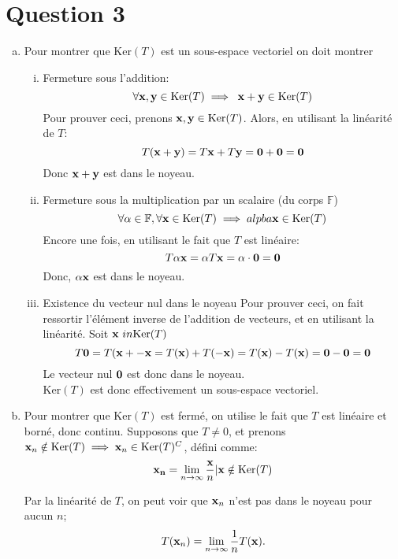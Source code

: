 \documentclass[letterpaper,12pt,oneside,final]{book}
\begin{document}
\newpage
\section*{Question 3}

\begin{enumerate}[a)]

\item %
Pour montrer que \( \text{Ker}(T) \) est un sous-espace vectoriel on doit montrer 
\begin{enumerate}[i)]
    \item Fermeture sous l'addition:
\[ \forall \vb{x},\vb{y} \in \text{Ker}(T) \implies \; \vb{x}+\vb{y} \in \text{Ker}(T) \]
Pour prouver ceci, prenons \( \vb{x}, \vb{y} \in \text{Ker}(T)\). 
Alors, en utilisant la linéarité de \( T \):
\[ T(\vb{x}+\vb{y}) = T\vb{x} +T\vb{y} = \vb{0} + \vb{0} = \vb{0}\]
Donc \( \vb{x} + \vb{y} \) est dans le noyeau.
    \item Fermeture sous la multiplication par un scalaire (du corps \( \mathbb{F}\))
\[ \forall \alpha \in \mathbb{F}, \forall \vb{x} \in \text{Ker}(T) \implies alpba \vb{x} \in \text{Ker}(T)\]
Encore une fois, en utilisant le fait que \( T \) est linéaire: 
\[ T \alpha \vb{x} = \alpha T\vb{x} = \alpha \cdot \vb{0} = \vb{0} \]
Donc, \( \alpha \vb{x} \) est dans le noyeau. 
    \item Existence du vecteur nul dans le noyeau 
Pour prouver ceci, on fait ressortir l'élément inverse de l'addition de vecteurs, et en utilisant la linéarité. Soit \( \vb{x} \ in \text{Ker}(T) \)
\[ T\vb{0} = T(\vb{x+ \vb{-x}} = T(\vb{x}) + T(\vb{-x}) = T(\vb{x}) - T(\vb{x}) = \vb{0} - \vb{0} = \vb{0} \]
Le vecteur nul \( \vb{0} \)  est donc dans le noyeau.\\ 
\( \text{Ker}(T) \) est donc effectivement un sous-espace vectoriel. 
\end{enumerate}

\item %
Pour montrer que \( \text{Ker}(T) \) est fermé, on utilise le fait que \( T \) est linéaire et borné, donc continu. 
Supposons que \( T \neq 0 \), et prenons \( \vb{x}_{n} \notin \text{Ker}(T) \implies \vb{x}_{n}\in \text{Ker}(T)^{C} \), défini comme:
\[ \vb{x_{n}} = \lim_{n \to \infty} \frac{\vb{x}}{n} | \vb{x} \notin \text{Ker}(T) \] 

Par la linéarité de \( T \), on peut voir que \( \vb{x}_{n} \) n'est pas dans le noyeau pour aucun \( n \);
\[ T(\vb{x}_{n}) = \lim_{n \to \infty} \frac{1}{n} T(\vb{x}) .\] 


\end{enumerate}
\end{document}
